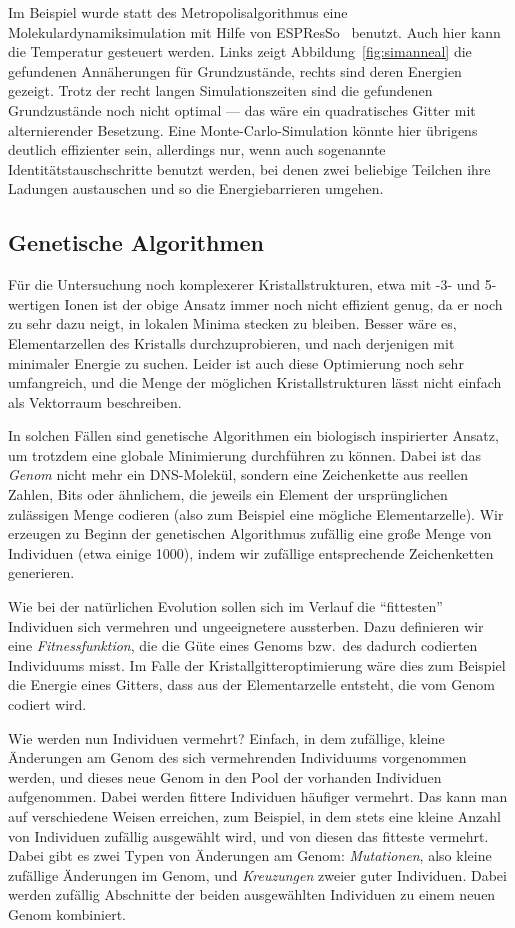 Im Beispiel wurde statt des Metropolisalgorithmus eine
Molekulardynamiksimulation mit Hilfe von ESPResSo~\cite{espresso}
benutzt. Auch hier kann die Temperatur gesteuert werden. Links zeigt
Abbildung~\ref{fig:simanneal} die gefundenen Annäherungen für
Grundzustände, rechts sind deren Energien gezeigt. Trotz der recht
langen Simulationszeiten sind die gefundenen Grundzustände noch nicht
optimal --- das wäre ein quadratisches Gitter mit alternierender
Besetzung. Eine Monte-Carlo-Simulation könnte hier übrigens deutlich
effizienter sein, allerdings nur, wenn auch sogenannte
Identitätstauschschritte benutzt werden, bei denen zwei beliebige
Teilchen ihre Ladungen austauschen und so die Energiebarrieren
umgehen.

\subsection{Genetische Algorithmen}

Für die Untersuchung noch komplexerer Kristallstrukturen, etwa mit -3-
und 5-wertigen Ionen ist der obige Ansatz immer noch nicht effizient
genug, da er noch zu sehr dazu neigt, in lokalen Minima stecken zu
bleiben. Besser wäre es, Elementarzellen des Kristalls
durchzuprobieren, und nach derjenigen mit minimaler Energie zu
suchen. Leider ist auch diese Optimierung noch sehr umfangreich, und
die Menge der möglichen Kristallstrukturen lässt nicht einfach als
Vektorraum beschreiben.

In solchen Fällen sind genetische Algorithmen ein biologisch
inspirierter Ansatz, um trotzdem eine globale Minimierung durchführen
zu können. Dabei ist das \emph{Genom} nicht mehr ein DNS-Molekül,
sondern eine Zeichenkette aus reellen Zahlen, Bits oder ähnlichem, die
jeweils ein Element der ursprünglichen zulässigen Menge codieren (also
zum Beispiel eine mögliche Elementarzelle). Wir erzeugen zu Beginn der
genetischen Algorithmus zufällig eine große Menge von Individuen (etwa
einige 1000), indem wir zufällige entsprechende Zeichenketten
generieren.

Wie bei der natürlichen Evolution sollen sich im Verlauf die
"`fittesten"' Individuen sich vermehren und ungeeignetere aussterben.
Dazu definieren wir eine \emph{Fitnessfunktion}, die die Güte eines
Genoms bzw.\ des dadurch codierten Individuums misst. Im Falle der
Kristallgitteroptimierung wäre dies zum Beispiel die Energie eines
Gitters, dass aus der Elementarzelle entsteht, die vom Genom codiert
wird.

Wie werden nun Individuen vermehrt? Einfach, in dem zufällige, kleine
Änderungen am Genom des sich vermehrenden Individuums vorgenommen
werden, und dieses neue Genom in den Pool der vorhanden Individuen
aufgenommen. Dabei werden fittere Individuen häufiger vermehrt. Das
kann man auf verschiedene Weisen erreichen, zum Beispiel, in dem stets
eine kleine Anzahl von Individuen zufällig ausgewählt wird, und von
diesen das fitteste vermehrt.  Dabei gibt es zwei Typen von Änderungen
am Genom: \emph{Mutationen}, also kleine zufällige Änderungen im
Genom, und \emph{Kreuzungen} zweier guter Individuen. Dabei werden
zufällig Abschnitte der beiden ausgewählten Individuen zu einem neuen
Genom kombiniert.

